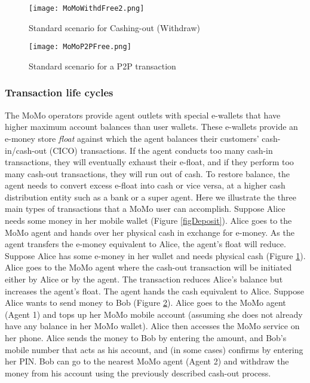 \begin{figure}[t]
\texttt{[image: MoMoWithdFree2.png]}
\caption{Standard scenario for Cashing-out (Withdraw)}
\label{figWithdraw}
\end{figure}

\begin{figure}[t]
\texttt{[image: MoMoP2PFree.png]}
\caption{Standard scenario for a P2P transaction}
\label{P2P}
\end{figure}

\subsubsection{Transaction life cycles}
\label{sec:floatdef}
The MoMo operators provide agent outlets with special e-wallets that have higher maximum account balances than user wallets.
These e-wallets provide an e-money store \textit{float} against which the agent balances their customers' cash-in/cash-out (CICO) transactions. If the agent conducts too many cash-in transactions, they will eventually exhaust their e-float, and if they perform too many cash-out transactions, they will run out of cash. To restore balance, the agent needs to convert excess e-float into cash or vice versa, at a higher cash distribution entity such as a bank or a super agent. Here we illustrate the three main types of transactions that a MoMo user can accomplish. 
Suppose Alice needs some money in her mobile wallet  (Figure \ref{figDeposit}). Alice goes to the MoMo agent and hands over her physical cash in exchange for e-money. As the agent transfers the e-money equivalent to Alice, the agent's float will reduce.
Suppose Alice has some e-money in her wallet and needs physical cash (Figure \ref{figWithdraw}). Alice goes to the MoMo agent where the cash-out transaction will be initiated either by Alice or by the agent. The transaction reduces Alice's balance but increases the agent's float. The agent  hands  the cash equivalent to Alice.
Suppose Alice wants to send money to Bob  (Figure \ref{P2P}). 
Alice goes to the MoMo agent (Agent 1) and tops up her MoMo mobile account (assuming she does not already have any balance in her MoMo wallet). Alice then accesses the MoMo service on her phone.  
Alice sends the money to Bob by entering the amount, and Bob's mobile number that acts as his account, and (in some cases) confirms by entering her PIN. Bob can go to the nearest MoMo agent (Agent 2) and withdraw the money from his account using the previously described cash-out process.
